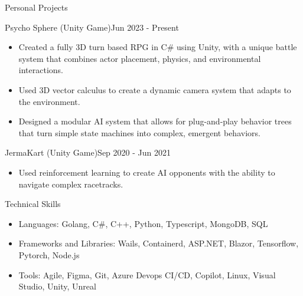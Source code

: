 \documentclass[]{mcdowellcv}
\begin{document}
\begin{cvsection}{Personal Projects}
  	\begin{cvsubsection}{Psycho Sphere (Unity Game)}{}{Jun 2023 - Present}
        \vspace{-5pt}
        \begin{itemize}
          \item Created a fully 3D turn based RPG in C# using Unity, with a unique battle system that combines actor placement, physics, and environmental interactions.
          \item Used 3D vector calculus to create a dynamic camera system that adapts to the environment.
          \item Designed a modular AI system that allows for plug-and-play behavior trees that turn simple state machines into complex, emergent behaviors.
        \end{itemize}
	\end{cvsubsection}
         \vspace{-4pt}
  	\begin{cvsubsection}{JermaKart (Unity Game)}{}{Sep 2020 - Jun 2021}
        \vspace{-5pt}
        \begin{itemize}
          \item Used reinforcement learning to create AI opponents with the ability to navigate complex racetracks.
        \end{itemize}
	\end{cvsubsection}
 \vspace{-6pt}
\end{cvsection}
\begin{cvsection}{Technical Skills}
	\begin{cvsubsection}{}{}{}
		\begin{itemize}
			\item Languages: Golang, C\#, C++, Python, Typescript, MongoDB, SQL
			\item Frameworks and Libraries: Wails, Containerd, ASP.NET, Blazor, Tensorflow, Pytorch, Node.js
			\item Tools: Agile, Figma, Git, Azure Devops CI/CD, Copilot, Linux, Visual Studio, Unity, Unreal
		\end{itemize}
	\end{cvsubsection}
\end{cvsection}
\end{document}
